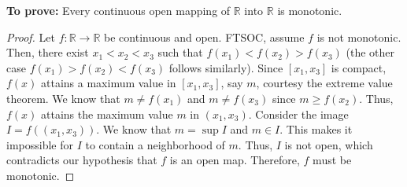 \documentclass[12pt]{article}
\begin{document}
{\bf To prove:} Every continuous open mapping of $\mathbb{R}$ into $\mathbb{R}$ is monotonic. 
\begin{proof}
      Let $f:\mathbb{R}\to \mathbb{R}$ be continuous and open. FTSOC, 
      assume $f$ is not monotonic. Then, there exist $x_{1}<x_{2}<x_{3}$ 
      such that $f(x_{1})<f(x_{2})>f(x_{3})$ 
      (the other case $f(x_{1})>f(x_{2})<f(x_{3})$ follows similarly). 
      Since $[x_{1}, x_{3}]$ is compact, $f(x)$ attains a maximum 
      value in $[x_{1}, x_{3}]$, say $m$, courtesy the extreme value 
      theorem. We know that $m\ne f(x_{1})$ and $m\ne f(x_{3})$ 
      since $m\ge f(x_{2})$. Thus, $f(x)$ attains the maximum value 
      $m$ in $(x_{1}, x_{3})$. Consider the image $I=f((x_{1}, x_{3}))$. 
      We know that $m=\sup I$ and $m\in I$. This makes it impossible 
      for $I$ to contain a neighborhood of $m$. Thus, $I$ is not open, 
      which contradicts our hypothesis that $f$ is an open map.
      Therefore, $f$ must be monotonic.
\end{proof}

\pagebreak
\end{document}

